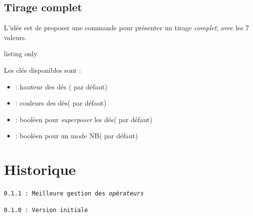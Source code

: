 \documentclass[11pt,a4paper]{ltxdoc}
\begin{document}
\begin{DemoCode}{}
\end{DemoCode}

\begin{DemoCode}{}
\end{DemoCode}

\subsection{Tirage complet}

L'idée est de proposer une commande pour présenter un tirage \textit{complet}, avec les 7 valeurs.

\begin{DemoCode}{listing only}
\end{DemoCode}

Les \textsf{clés} disponibles sont :

\begin{itemize}
	\item {} : hauteur des dés \hfill(\ShowCode{1.5cm} par défaut)
	\item {} : couleurs des dés\hfill( par défaut)
	\item {} : booléen pour \textit{superposer} les dés\hfill( par défaut)
	\item {} : booléen pour un mode NB\hfill( par défaut)
\end{itemize}

\begin{DemoCode}{}
\end{DemoCode}

\begin{DemoCode}{}
\end{DemoCode}

\pagebreak

\section{Historique}

\texttt{0.1.1 : Meilleure gestion des \textit{opérateurs}}

\texttt{0.1.0 : Version initiale}
%
%
\end{document}
